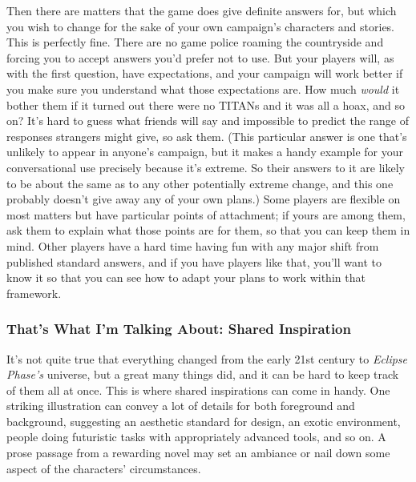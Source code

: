 Then there are matters that the game does give definite answers for, but which you wish to change for the sake of your own campaign's characters and stories. This is perfectly fine. There are no game police roaming the countryside and forcing you to accept answers you'd prefer not to use. But your players will, as with the first question, have expectations, and your campaign will work better if you make sure you understand what those expectations are. How much \textit{would }it bother them if it turned out there were no TITANs and it was all a hoax, and so on? It's hard to guess what friends will say and impossible to predict the range of responses strangers might give, so ask them. (This particular answer is one that's unlikely to appear in anyone's campaign, but it makes a handy example for your conversational use precisely because it's extreme. So their answers to it are likely to be about the same as to any other potentially extreme change, and this one probably doesn't give away any of your own plans.) Some players are flexible on most matters but have particular points of attachment; if yours are among them, ask them to explain what those points are for them, so that you can keep them in mind. Other players have a hard time having fun with any major shift from published standard answers, and if you have players like that, you'll want to know it so that you can see how to adapt your plans to work within that framework. 

\subsubsection{That's What I'm Talking About: Shared Inspiration } 

It's not quite true that everything changed from the early 21st century to \textit{Eclipse Phase's} universe, but a great many things did, and it can be hard to keep track of them all at once. This is where shared inspirations can come in handy. One striking illustration can convey a lot of details for both foreground and background, suggesting an aesthetic standard for design, an exotic environment, people doing futuristic tasks with appropriately advanced tools, and so on. A prose passage from a rewarding novel may set an ambiance or nail down some aspect of the characters' circumstances. 

